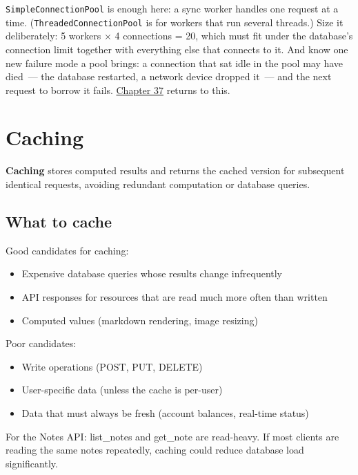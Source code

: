 \noindent{}\texttt{SimpleConnectionPool} is enough here: a sync worker handles one request at a time. (\texttt{ThreadedConnectionPool} is for workers that run several threads.) Size it deliberately: 5 workers × 4 connections = 20, which must fit under the database's connection limit together with everything else that connects to it. And know one new failure mode a pool brings: a connection that sat idle in the pool may have died~--- the database restarted, a network device dropped it~--- and the next request to borrow it fails. \hyperref[ch:37-reliability]{Chapter 37} returns to this.

\setcounter{section}{5}
\section{Caching}\label{36-scaling-load:366-caching}

\textbf{Caching} stores computed results and returns the cached version for subsequent identical requests, avoiding redundant computation or database queries.

\subsection*{What to cache}\label{36-scaling-load:what-to-cache}

Good candidates for caching:

\begin{itemize}
\tightlist
\item
  Expensive database queries whose results change infrequently
\item
  API responses for resources that are read much more often than written
\item
  Computed values (markdown rendering, image resizing)
\end{itemize}

\noindent{}Poor candidates:

\begin{itemize}
\tightlist
\item
  Write operations (POST, PUT, DELETE)
\item
  User-specific data (unless the cache is per-user)
\item
  Data that must always be fresh (account balances, real-time status)
\end{itemize}

\noindent{}For the Notes API: list\_notes and get\_note are read-heavy. If most clients are reading the same notes repeatedly, caching could reduce database load significantly.

